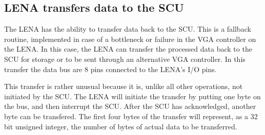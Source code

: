 
\subsection{LENA transfers data to the SCU}
The \ac{LENA} has the ability to transfer data back to the \ac{SCU}. This is a
fallback routine, implemented in case of a bottleneck or failure in the \ac{VGA}
controller on the \ac{LENA}. In this case, the \ac{LENA} can transfer the
processed data back to the \ac{SCU} for storage or to be sent through an
alternative \ac{VGA} controller. In this transfer the data bus are 8 pins
connected to the \ac{LENA}'s \ac{I/O} pins.

This transfer is rather unusual because it is, unlike all other operations, not
initiated by the \ac{SCU}. The \ac{LENA} will initiate the transfer by putting
one byte on the bus, and then interrupt the \ac{SCU}. After the \ac{SCU} has
acknowledged, another byte can be transfered. The first four bytes of the
transfer will represent, as a 32 bit unsigned integer, the number of bytes of
actual data to be transferred.

